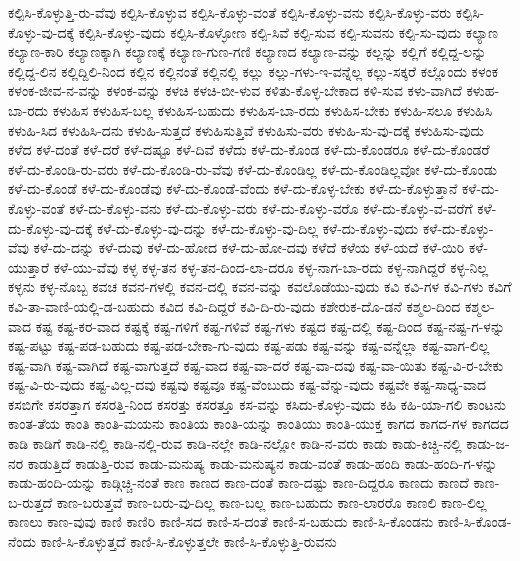 {ಕಲ್ಪಿಸಿ-ಕೊಳ್ಳುತ್ತಿ-ರು-ವೆವು
ಕಲ್ಪಿಸಿ-ಕೊಳ್ಳುವ
ಕಲ್ಪಿಸಿ-ಕೊಳ್ಳು-ವಂತೆ
ಕಲ್ಪಿಸಿ-ಕೊಳ್ಳು-ವನು
ಕಲ್ಪಿಸಿ-ಕೊಳ್ಳು-ವರು
ಕಲ್ಪಿಸಿ-ಕೊಳ್ಳು-ವು-ದಕ್ಕೆ
ಕಲ್ಪಿಸಿ-ಕೊಳ್ಳು-ವುದು
ಕಲ್ಪಿಸಿ-ಕೊಳ್ಳೋಣ
ಕಲ್ಪಿ-ಸಿವೆ
ಕಲ್ಪಿ-ಸುವ
ಕಲ್ಪಿ-ಸುವನು
ಕಲ್ಪಿ-ಸು-ವುದು
ಕಲ್ಯಾಣ
ಕಲ್ಯಾಣ-ಕಾರಿ
ಕಲ್ಯಾಣಕ್ಕಾಗಿ
ಕಲ್ಯಾಣಕ್ಕೆ
ಕಲ್ಯಾಣ-ಗುಣ-ಗಣಿ
ಕಲ್ಯಾಣದ
ಕಲ್ಯಾಣ-ವನ್ನು
ಕಲ್ಲನ್ನು
ಕಲ್ಲಿಗೆ
ಕಲ್ಲಿದ್ದ-ಲನ್ನು
ಕಲ್ಲಿದ್ದ-ಲಿನ
ಕಲ್ಲಿದ್ದಿಲಿ-ನಿಂದ
ಕಲ್ಲಿನ
ಕಲ್ಲಿನಂತೆ
ಕಲ್ಲಿನಲ್ಲಿ
ಕಲ್ಲು
ಕಲ್ಲು-ಗಳು-ಇ-ವನ್ನೆಲ್ಲ
ಕಲ್ಲು-ಸಕ್ಕರೆ
ಕಲ್ಲೊಂದು
ಕಳಂಕ
ಕಳಂಕ-ಜೀವ-ನ-ವನ್ನು
ಕಳಂಕ-ವನ್ನು
ಕಳಚಿ
ಕಳಚಿ-ಬೀ-ಳುವ
ಕಳಿತು-ಕೊಳ್ಳ-ಬೇಕಾದ
ಕಳಿ-ಸುವ
ಕಳು-ವಾಗಿದೆ
ಕಳುಹ-ಬಾ-ರದು
ಕಳುಹಿಸ
ಕಳುಹಿಸ-ಬಲ್ಲ
ಕಳುಹಿಸ-ಬಹುದು
ಕಳುಹಿಸ-ಬಾ-ರದು
ಕಳುಹಿಸ-ಬೇಕು
ಕಳುಹಿ-ಸಲೂ
ಕಳುಹಿಸಿ
ಕಳುಹಿ-ಸಿದ
ಕಳುಹಿಸಿ-ದನು
ಕಳುಹಿ-ಸುತ್ತದೆ
ಕಳುಹಿಸುತ್ತಿವೆ
ಕಳುಹಿಸು-ವರು
ಕಳುಹಿ-ಸು-ವು-ದಕ್ಕೆ
ಕಳುಹಿಸು-ವುದು
ಕಳೆದ
ಕಳೆ-ದಂತೆ
ಕಳೆ-ದರೆ
ಕಳೆ-ದಷ್ಟೂ
ಕಳೆ-ದಿವೆ
ಕಳೆದು
ಕಳೆ-ದು-ಕೊಂಡ
ಕಳೆ-ದು-ಕೊಂಡರೂ
ಕಳೆ-ದು-ಕೊಂಡರೆ
ಕಳೆ-ದು-ಕೊಂಡಿ-ರು-ವರು
ಕಳೆ-ದು-ಕೊಂಡಿ-ರು-ವೆವು
ಕಳೆ-ದು-ಕೊಂಡಿಲ್ಲ
ಕಳೆ-ದು-ಕೊಂಡಿಲ್ಲವೋ
ಕಳೆ-ದು-ಕೊಂಡು
ಕಳೆ-ದು-ಕೊಂಡೆ
ಕಳೆ-ದು-ಕೊಂಡೆವು
ಕಳೆ-ದು-ಕೊಂಡೆ-ವೆಂದು
ಕಳೆ-ದು-ಕೊಳ್ಳ-ಬೇಕು
ಕಳೆ-ದು-ಕೊಳ್ಳುತ್ತಾನೆ
ಕಳೆ-ದು-ಕೊಳ್ಳು-ವಂತೆ
ಕಳೆ-ದು-ಕೊಳ್ಳು-ವನು
ಕಳೆ-ದು-ಕೊಳ್ಳು-ವರು
ಕಳೆ-ದು-ಕೊಳ್ಳು-ವರೊ
ಕಳೆ-ದು-ಕೊಳ್ಳು-ವ-ವರೆಗೆ
ಕಳೆ-ದು-ಕೊಳ್ಳು-ವು-ದಕ್ಕೆ
ಕಳೆ-ದು-ಕೊಳ್ಳು-ವು-ದನ್ನು
ಕಳೆ-ದು-ಕೊಳ್ಳು-ವು-ದಿಲ್ಲ
ಕಳೆ-ದು-ಕೊಳ್ಳು-ವುದು
ಕಳೆ-ದು-ಕೊಳ್ಳು-ವೆವು
ಕಳೆ-ದು-ದನ್ನು
ಕಳೆ-ದುವು
ಕಳೆ-ದು-ಹೋದ
ಕಳೆ-ದು-ಹೋ-ದವು
ಕಳೆದೆ
ಕಳೆಯ
ಕಳೆ-ಯದೆ
ಕಳೆ-ಯಿರಿ
ಕಳೆ-ಯುತ್ತಾರೆ
ಕಳೆ-ಯು-ವೆವು
ಕಳ್ಳ
ಕಳ್ಳ-ತನ
ಕಳ್ಳ-ತನ-ದಿಂದ-ಲಾ-ದರೂ
ಕಳ್ಳ-ನಾಗ-ಬಾ-ರದು
ಕಳ್ಳ-ನಾಗಿದ್ದರೆ
ಕಳ್ಳ-ನಿಲ್ಲ
ಕಳ್ಳನು
ಕಳ್ಳ-ನೊಬ್ಬ
ಕವಚ
ಕವನ-ಗಳಲ್ಲಿ
ಕವನ-ದಲ್ಲಿ
ಕವನ-ವನ್ನು
ಕವಲೊಡೆಯು-ವುದು
ಕವಿ
ಕವಿ-ಗಳ
ಕವಿ-ಗಳು
ಕವಿಗೆ
ಕವಿ-ತಾ-ವಾಣಿ-ಯಲ್ಲಿ-ಡ-ಬಹುದು
ಕವಿದ
ಕವಿ-ದಿದ್ದರೆ
ಕವಿ-ದಿ-ರು-ವುದು
ಕಶೇರುಕ-ದೊ-ಡನೆ
ಕಶ್ಮಲ-ದಿಂದ
ಕಶ್ಮಲ-ವಾದ
ಕಷ್ಟ
ಕಷ್ಟ-ಕರ-ವಾದ
ಕಷ್ಟಕ್ಕೆ
ಕಷ್ಟ-ಗಳಿಗೆ
ಕಷ್ಟ-ಗಳಿವೆ
ಕಷ್ಟ-ಗಳು
ಕಷ್ಟದ
ಕಷ್ಟ-ದಲ್ಲಿ
ಕಷ್ಟ-ದಿಂದ
ಕಷ್ಟ-ನಷ್ಟ-ಗ-ಳನ್ನು
ಕಷ್ಟ-ಪಟ್ಟು
ಕಷ್ಟ-ಪಡ-ಬಹುದು
ಕಷ್ಟ-ಪಡ-ಬೇಕಾ-ಗು-ವುದು
ಕಷ್ಟ-ಪಡು
ಕಷ್ಟ-ವನ್ನು
ಕಷ್ಟ-ವನ್ನೆಲ್ಲಾ
ಕಷ್ಟ-ವಾಗ-ಲಿಲ್ಲ
ಕಷ್ಟ-ವಾಗಿ
ಕಷ್ಟ-ವಾಗಿದೆ
ಕಷ್ಟ-ವಾಗುತ್ತದೆ
ಕಷ್ಟ-ವಾದ
ಕಷ್ಟ-ವಾ-ದರೆ
ಕಷ್ಟ-ವಾ-ದವು
ಕಷ್ಟ-ವಾ-ಯಿತು
ಕಷ್ಟ-ವಿ-ರ-ಬೇಕು
ಕಷ್ಟ-ವಿ-ರು-ವುದು
ಕಷ್ಟ-ವಿಲ್ಲ-ದವು
ಕಷ್ಟವು
ಕಷ್ಟವೂ
ಕಷ್ಟ-ವೆಂಬುದು
ಕಷ್ಟ-ವೆನ್ನು-ವುದು
ಕಷ್ಟವೇ
ಕಷ್ಟ-ಸಾಧ್ಯ-ವಾದ
ಕಸಬಿಗೇ
ಕಸರತ್ತಾಗ
ಕಸರತ್ತಿ-ನಿಂದ
ಕಸರತ್ತು
ಕಸರತ್ತೂ
ಕಸ-ವನ್ನು
ಕಸಿದು-ಕೊಳ್ಳು-ವುದು
ಕಹಿ
ಕಹಿ-ಯಾ-ಗಲಿ
ಕಾಂಟನು
ಕಾಂತ-ತೆಯ
ಕಾಂತಿ
ಕಾಂತಿ-ಮಯನು
ಕಾಂತಿಯ
ಕಾಂತಿ-ಯನ್ನು
ಕಾಂತಿಯು
ಕಾಂತಿ-ಯುಕ್ತ
ಕಾಗದ
ಕಾಗದ-ಗಳ
ಕಾಗದದ
ಕಾಡಿ
ಕಾಡಿಗೆ
ಕಾಡಿ-ನಲ್ಲಿ
ಕಾಡಿ-ನಲ್ಲಿ-ರುವ
ಕಾಡಿ-ನಲ್ಲೇ
ಕಾಡಿ-ನಲ್ಲೋ
ಕಾಡಿ-ನ-ವರು
ಕಾಡು
ಕಾಡು-ಕಿಚ್ಚಿ-ನಲ್ಲಿ
ಕಾಡು-ಜ-ನರ
ಕಾಡುತ್ತಿದೆ
ಕಾಡುತ್ತಿ-ರುವ
ಕಾಡು-ಮನುಷ್ಯ
ಕಾಡು-ಮನುಷ್ಯನ
ಕಾಡು-ವಂತೆ
ಕಾಡು-ಹಂದಿ
ಕಾಡು-ಹಂದಿ-ಗ-ಳನ್ನು
ಕಾಡು-ಹಂದಿ-ಯನ್ನು
ಕಾಡ್ಗಿಚ್ಚಿ-ನಂತೆ
ಕಾಣ
ಕಾಣದ
ಕಾಣ-ದಂತೆ
ಕಾಣ-ದಷ್ಟು
ಕಾಣ-ದಿದ್ದರೂ
ಕಾಣದು
ಕಾಣದೆ
ಕಾಣ-ಬ-ರುತ್ತದೆ
ಕಾಣ-ಬರುತ್ತವೆ
ಕಾಣ-ಬರು-ವು-ದಿಲ್ಲ
ಕಾಣ-ಬಲ್ಲ
ಕಾಣ-ಬಹುದು
ಕಾಣ-ಲಾರರೊ
ಕಾಣಲಿ
ಕಾಣ-ಲಿಲ್ಲ
ಕಾಣಲು
ಕಾಣ-ವುವು
ಕಾಣಿ
ಕಾಣಿರಿ
ಕಾಣಿ-ಸದ
ಕಾಣಿ-ಸ-ದಂತೆ
ಕಾಣಿ-ಸ-ಬಹುದು
ಕಾಣಿ-ಸಿ-ಕೊಂಡನು
ಕಾಣಿ-ಸಿ-ಕೊಂಡ-ನೆಂದು
ಕಾಣಿ-ಸಿ-ಕೊಳ್ಳುತ್ತದೆ
ಕಾಣಿ-ಸಿ-ಕೊಳ್ಳುತ್ತಲೇ
ಕಾಣಿ-ಸಿ-ಕೊಳ್ಳುತ್ತಿ-ರುವನು
}

